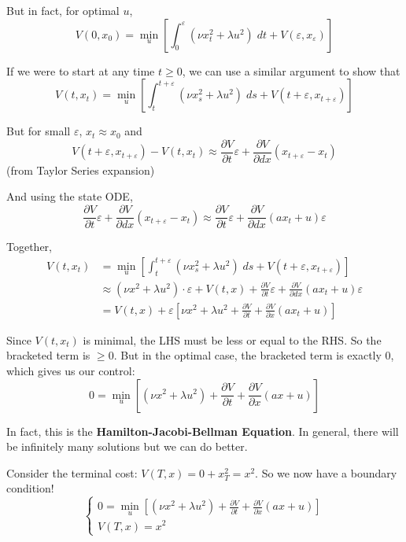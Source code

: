 \documentclass[12pt]{report}
\newcommand{\ep}{\varepsilon}
\begin{document}
        But in fact, for optimal $u$, 
        \[V(0, x_0) = \min_u \left[\int_0^{\ep} (\nu x_t^2 + \lambda u^2)\; dt + V(\ep, x_{\ep})\right]\] 

        If we were to start at any time $t \geq 0$, we can use a similar argument to show that
        \[V(t, x_t) = \min_u \left[\int_t^{t + \ep} (\nu x_s^2 + \lambda u^2)\; ds + V(t + \ep, x_{t + \ep})\right]\]

        But for small $\ep$, $x_t \approx x_0$ and 
        \[V(t + \ep, x_{t + \ep}) - V(t, x_t) \approx \frac{\partial V}{\partial t} \ep + \frac{\partial V}{\partial dx}(x_{t + \ep} - x_t) \] 
        (from Taylor Series expansion)

        And using the state ODE, 
        \[\frac{\partial V}{\partial t} \ep + \frac{\partial V}{\partial dx}(x_{t + \ep} - x_t)  \approx \frac{\partial V}{\partial t} \ep + \frac{\partial V}{\partial dx}(ax_t + u) \ep\] 

        Together, 
        \begin{align*}
            V(t, x_t) &= \min_u \left[\int_t^{t + \ep} (\nu x_s^2 + \lambda u^2)\; ds + V(t + \ep, x_{t + \ep})\right]\\ 
                &\approx (\nu x^2 + \lambda u^2) \cdot \ep + V(t, x) + \frac{\partial V}{\partial t} \ep + \frac{\partial V}{\partial dx}(ax_t + u) \ep\\ 
                &= V(t, x) + \ep \left[\nu x^2 + \lambda u^2 + \frac{\partial V}{\partial t} + \frac{\partial V}{\partial x}(ax_t + u)\right]
        \end{align*}

        Since $V(t, x_t)$ is minimal, the LHS must be less or equal to the RHS. So the bracketed term is $\geq 0$. But in the optimal case, the bracketed term is exactly 0, which gives us our control: 
        \[0 = \min_u \left[(\nu x^2 + \lambda u^2) + \frac{\partial V}{\partial t} + \frac{\partial V}{\partial x}(ax + u)\right]\]

        In fact, this is the \textbf{Hamilton-Jacobi-Bellman Equation}. In general, there will be infinitely many solutions but we can do better. 

        Consider the terminal cost: $V(T, x) = 0 + x_T^2 = x^2$. So we now have a boundary condition!
        \[\begin{cases}
            0 = \min_u \left[(\nu x^2 + \lambda u^2) + \frac{\partial V}{\partial t} + \frac{\partial V}{\partial x}(ax + u)\right]\\ 
            V(T, x) = x^2
        \end{cases}\]
\end{document}
